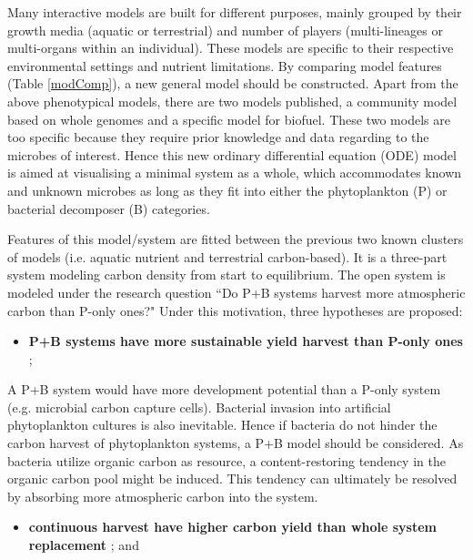 \documentclass[../thesis.tex]{subfiles} %
\begin{document}
Many interactive models are built for different purposes, mainly grouped by their growth media (aquatic or terrestrial) and number of players (multi-lineages or multi-organs within an individual).  These models are specific to their respective environmental settings and nutrient limitations.  By comparing model features (Table \ref{modComp}), a new general model should be constructed.  Apart from the above phenotypical models, there are two models published, a community model based on whole genomes\autocite{harcombe2014metabolic} and a specific model for biofuel\autocite{kirthiga2014mathematical}.  These two models are too specific because they require prior knowledge and data regarding to the microbes of interest.  Hence this new ordinary differential equation (ODE) model is aimed at visualising a minimal system as a whole, which accommodates known and unknown microbes as long as they fit into either the phytoplankton (P) or bacterial decomposer (B) categories.

Features of this model/system are fitted between the previous two known clusters of models (i.e. aquatic nutrient and terrestrial carbon-based).  It is a three-part system modeling carbon density from start to equilibrium.  The open system is modeled under the research question ``Do P+B systems harvest more atmospheric carbon than P-only ones?"
Under this motivation, three hypotheses are proposed:
\begin{itemize}
    \item \textbf{
    P+B systems have more sustainable yield harvest than P-only ones
    };
\end{itemize}

A P+B system would have more development potential than a P-only system (e.g. microbial carbon capture cells).  Bacterial invasion into artificial phytoplankton cultures is also inevitable.  Hence if bacteria do not hinder the carbon harvest of phytoplankton systems, a P+B model should be considered.  As bacteria utilize organic carbon as resource, a content-restoring tendency in the organic carbon pool might be induced.  This tendency can ultimately be resolved by absorbing more atmospheric carbon into the system.

\begin{itemize}
    \item \textbf{
    continuous harvest have higher carbon yield than whole system replacement
    }; and
\end{itemize}
\end{document}
